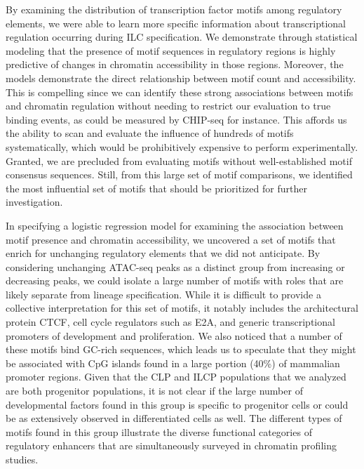 By examining the distribution of transcription factor motifs among regulatory elements, we were able to learn more specific information about transcriptional regulation occurring during ILC specification. We demonstrate through statistical modeling that the presence of motif sequences in regulatory regions is highly predictive of changes in chromatin accessibility in those regions. Moreover, the models demonstrate the direct relationship between motif count and accessibility. This is compelling since we can identify these strong associations between motifs and chromatin regulation without needing to restrict our evaluation to true binding events, as could be measured by CHIP-seq for instance. This affords us the ability to scan and evaluate the influence of hundreds of motifs systematically, which would be prohibitively expensive to perform experimentally. Granted, we are precluded from evaluating motifs without well-established motif consensus sequences. Still, from this large set of motif comparisons, we identified the most influential set of motifs that should be prioritized for further investigation.

In specifying a logistic regression model for examining the association between motif presence and chromatin accessibility, we uncovered a set of motifs that enrich for unchanging regulatory elements that we did not anticipate. By considering unchanging ATAC-seq peaks as a distinct group from increasing or decreasing peaks, we could isolate a large number of motifs with roles that are likely separate from lineage specification. While it is difficult to provide a collective interpretation for this set of motifs, it notably includes the architectural protein CTCF, cell cycle regulators such as E2A, and generic transcriptional promoters of development and proliferation. We also noticed that a number of these motifs bind GC-rich sequences, which leads us to speculate that they might be associated with CpG islands found in a large portion (40\%) of mammalian promoter regions. Given that the CLP and ILCP populations that we analyzed are both progenitor populations, it is not clear if the large number of developmental factors found in this group is specific to progenitor cells or could be as extensively observed in differentiated cells as well. The different types of motifs found in this group illustrate the diverse functional categories of regulatory enhancers that are simultaneously surveyed in chromatin profiling studies.

